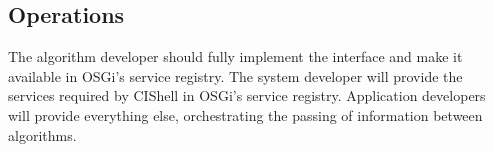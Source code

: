\subsection{Operations}

The algorithm developer should fully implement the 
interface and make it available in OSGi's service registry. The system developer
will provide the services required by CIShell in OSGi's service registry.
Application developers will provide everything else, orchestrating the passing of
information between algorithms.
